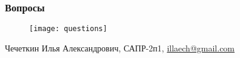 \begin{frame}
    \frametitle{Вопросы}
    \begin{minipage}{0.3\textwidth}
        \begin{figure}[ht!]
            \centering
            \texttt{[image: questions]}
        \end{figure}
    \end{minipage}
    \begin{minipage}{0.6\textwidth}
        \begin{center}
            Чечеткин Илья Александрович, САПР-2п1,
            \href{mailto:illaech@gmail.com}{illaech@gmail.com}
        \end{center}
    \end{minipage}
\end{frame}

